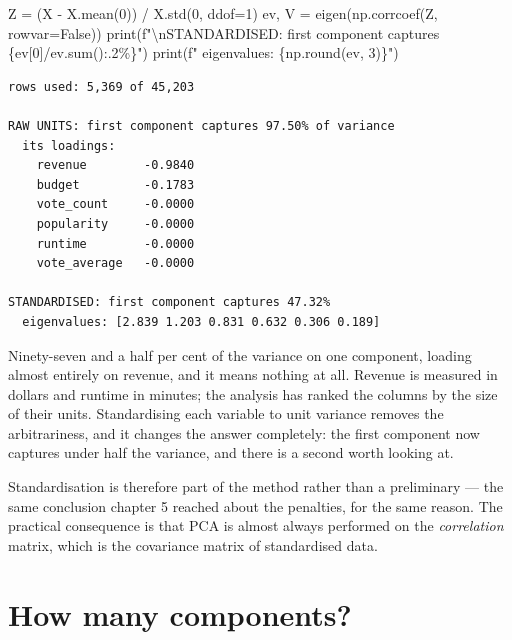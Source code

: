 \documentclass[
  letterpaper,
  10pt,
  twoside,
  openright,
  numbers=noenddot,
  chapterprefix=true]{scrbook}
\newenvironment{Shaded}{}{}
\newcommand{\BuiltInTok}[1]{\textcolor[rgb]{0.84,0.23,0.29}{#1}}
\newcommand{\CharTok}[1]{\textcolor[rgb]{0.01,0.18,0.38}{#1}}
\newcommand{\DecValTok}[1]{\textcolor[rgb]{0.00,0.36,0.77}{#1}}
\newcommand{\NormalTok}[1]{\textcolor[rgb]{0.14,0.16,0.18}{#1}}
\newcommand{\OperatorTok}[1]{\textcolor[rgb]{0.14,0.16,0.18}{#1}}
\newcommand{\SpecialCharTok}[1]{\textcolor[rgb]{0.00,0.36,0.77}{#1}}
\newcommand{\SpecialStringTok}[1]{\textcolor[rgb]{0.01,0.18,0.38}{#1}}
\newcommand{\VariableTok}[1]{\textcolor[rgb]{0.89,0.38,0.04}{#1}}
\begin{document}
\begin{Shaded}
\begin{Highlighting}[]
\NormalTok{Z }\OperatorTok{=}\NormalTok{ (X }\OperatorTok{{-}}\NormalTok{ X.mean(}\DecValTok{0}\NormalTok{)) }\OperatorTok{/}\NormalTok{ X.std(}\DecValTok{0}\NormalTok{, ddof}\OperatorTok{=}\DecValTok{1}\NormalTok{)}
\NormalTok{ev, V }\OperatorTok{=}\NormalTok{ eigen(np.corrcoef(Z, rowvar}\OperatorTok{=}\VariableTok{False}\NormalTok{))}
\BuiltInTok{print}\NormalTok{(}\SpecialStringTok{f"}\CharTok{\textbackslash{}n}\SpecialStringTok{STANDARDISED: first component captures }\SpecialCharTok{\{}\NormalTok{ev[}\DecValTok{0}\NormalTok{]}\OperatorTok{/}\NormalTok{ev}\SpecialCharTok{.}\BuiltInTok{sum}\NormalTok{()}\SpecialCharTok{:.2\%\}}\SpecialStringTok{"}\NormalTok{)}
\BuiltInTok{print}\NormalTok{(}\SpecialStringTok{f"  eigenvalues: }\SpecialCharTok{\{}\NormalTok{np}\SpecialCharTok{.}\BuiltInTok{round}\NormalTok{(ev, }\DecValTok{3}\NormalTok{)}\SpecialCharTok{\}}\SpecialStringTok{"}\NormalTok{)}
\end{Highlighting}
\end{Shaded}

\begin{verbatim}
rows used: 5,369 of 45,203

RAW UNITS: first component captures 97.50% of variance
  its loadings:
    revenue        -0.9840
    budget         -0.1783
    vote_count     -0.0000
    popularity     -0.0000
    runtime        -0.0000
    vote_average   -0.0000

STANDARDISED: first component captures 47.32%
  eigenvalues: [2.839 1.203 0.831 0.632 0.306 0.189]
\end{verbatim}

Ninety-seven and a half per cent of the variance on one component,
loading almost entirely on revenue, and it means nothing at all. Revenue
is measured in dollars and runtime in minutes; the analysis has ranked
the columns by the size of their units. Standardising each variable to
unit variance removes the arbitrariness, and it changes the answer
completely: the first component now captures under half the variance,
and there is a second worth looking at.

Standardisation is therefore part of the method rather than a
preliminary --- the same conclusion chapter 5 reached about the
penalties, for the same reason. The practical consequence is that PCA is
almost always performed on the \emph{correlation} matrix, which is the
covariance matrix of standardised data.

\section{How many components?}\label{how-many-components}
\end{document}
